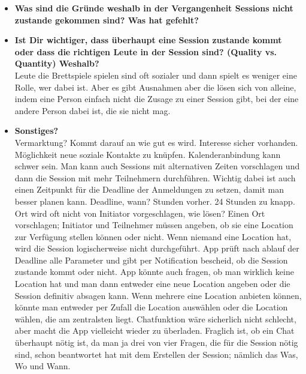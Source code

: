 \begin{appendix}
\begin{itemize}
    \item \textbf{Was sind die Gründe weshalb in der Vergangenheit Sessions nicht zustande gekommen sind? Was hat gefehlt?}\\
    \item \textbf{Ist Dir wichtiger, dass überhaupt eine Session zustande kommt oder dass die richtigen Leute in der Session sind? (Quality vs. Quantity) Weshalb?}\\
    Leute die Brettspiele spielen sind oft sozialer und dann spielt es weniger eine Rolle, wer dabei ist. Aber es gibt Ausnahmen aber die lösen sich von alleine, indem eine Person einfach nicht die Zusage zu einer Session gibt, bei der eine andere Person dabei ist, die sie nicht mag.
    \item \textbf{Sonstiges?}\\
    Vermarktung? Kommt darauf an wie gut es wird. Interesse sicher vorhanden.
    \newline
    Möglichkeit neue soziale Kontakte zu knüpfen.
    \newline
    Kalenderanbindung kann schwer sein.
    \newline
    Man kann auch Sessions mit alternativen Zeiten vorschlagen und dann die Session mit mehr Teilnehmern durchführen. Wichtig dabei ist auch einen Zeitpunkt für die Deadline der Anmeldungen zu setzen, damit man besser planen kann.
    \newline
    Deadline, wann?
     Stunden vorher. 24 Stunden zu knapp.
    \newline
    Ort wird oft nicht von Initiator vorgeschlagen, wie lösen?
    \newline
    Einen Ort vorschlagen; Initiator und Teilnehmer müssen angeben, ob sie eine Location zur Verfügung stellen können oder nicht. Wenn niemand eine Location hat, wird die Session logischerweise nicht durchgeführt. App prüft nach ablauf der Deadline alle Parameter und gibt per Notification bescheid, ob die Session zustande kommt oder nicht. App könnte auch fragen, ob man wirklich keine Location hat und man dann entweder eine neue Location angeben oder die Session definitiv absagen kann. Wenn mehrere eine Location anbieten können, könnte man entweder per Zufall die Location auswählen oder die Location wählen, die am zentralsten liegt.
    \newline
    Chatfunktion wäre sicherlich nicht schlecht, aber macht die App vielleicht wieder zu überladen. Fraglich ist, ob ein Chat überhaupt nötig ist, da man ja drei von vier Fragen, die für die Session nötig sind, schon beantwortet hat mit dem Erstellen der Session; nämlich das Was, Wo und Wann.

\end{itemize}
\end{appendix}
